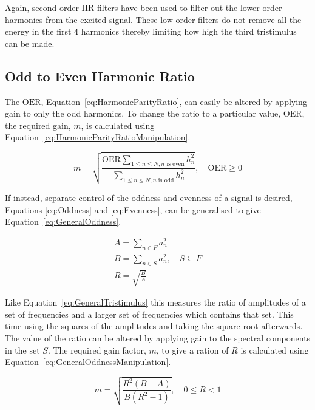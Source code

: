 		Again, second order IIR filters have been used to filter out the lower order harmonics from the excited
		signal.	These low order filters do not remove all the energy in the first 4 harmonics thereby limiting how
		high the third tristimulus can be made.

	\subsection{Odd to Even Harmonic Ratio}
	\label{sec:FeatureControl-Parameterisation-HarmonicParityRatio}
		The $\mathrm{OER}$, Equation~\ref{eq:HarmonicParityRatio}, can easily be altered by applying gain to only
		the odd harmonics. To change the ratio to a particular value, $\mathrm{OER}$, the required gain, $m$, is
		calculated using Equation~\ref{eq:HarmonicParityRatioManipulation}.

		\begin{equation}
			m = \sqrt{\frac{\mathrm{OER}\sum_{1 \leq n \leq N, n \text{ is even}} h_{n}^{2}}
				       {\sum_{1 \leq n \leq N, n \text{ is odd}} h_{n}^{2}}},
				       \quad \mathrm{OER} \geq 0
		       \label{eq:HarmonicParityRatioManipulation}
		\end{equation}

		If instead, separate control of the oddness and evenness of a signal is desired, Equations \ref{eq:Oddness}
		and \ref{eq:Evenness}, can be generalised to give Equation~\ref{eq:GeneralOddness}.

		\begin{gather}
			A = \sum_{n \in F} a_{n}^{2} \nonumber \\
			B = \sum_{n \in S} a_{n}^{2}, \quad S \subseteq F \nonumber \\
			R = \sqrt{\frac{B}{A}}
			\label{eq:GeneralOddness}
		\end{gather}

		Like Equation~\ref{eq:GeneralTristimulus} this measures the ratio of amplitudes of a set of frequencies and
		a larger set of frequencies which contains that set. This time using the squares of the amplitudes and
		taking the square root afterwards. The value of the ratio can be altered by applying gain to the spectral
		components in the set $S$. The required gain factor, $m$, to give a ration of $R$ is calculated using
		Equation~\ref{eq:GeneralOddnessManipulation}.

		\begin{equation}
			m = \sqrt{\frac{R^{2}(B - A)}{B(R^{2} - 1)}}, \quad 0 \leq R < 1
			\label{eq:GeneralOddnessManipulation}
		\end{equation}

